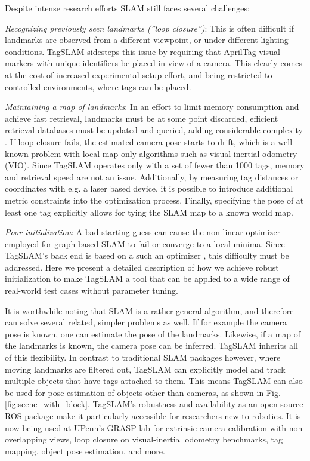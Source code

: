 Despite intense research efforts \cite{cadena2016} SLAM still faces
several challenges:

{\em Recognizing previously seen landmarks (''loop closure'')}: This
is often difficult if landmarks are observed from a different
viewpoint, or under different lighting conditions. TagSLAM sidesteps
this issue by requiring that AprilTag visual markers \cite{wang2016}
with unique identifiers be placed in view of a camera. This clearly
comes at the cost of increased experimental setup effort, and being
restricted to controlled environments, where tags can be placed.

{\em Maintaining a map of landmarks}: In an effort to limit memory
consumption and achieve fast retrieval, landmarks must be at some
point discarded, efficient retrieval databases must be updated and
queried, adding considerable complexity \cite{murartal2016}. If loop
closure fails, the estimated camera pose starts to drift, which is a
well-known problem with local-map-only algorithms such as
visual-inertial odometry (VIO). Since TagSLAM operates only with a set
of fewer than 1000 tags, memory and retrieval speed are not an
issue. Additionally, by measuring tag distances or coordinates with
e.g. a laser based device, it is possible to introduce additional
metric constraints into the optimization process. Finally, specifying
the pose of at least one tag explicitly allows for tying the SLAM map
to a known world map.

{\em Poor initialization}: A bad starting guess can cause the
non-linear optimizer employed for graph based SLAM to fail or converge
to a local minima. Since TagSLAM's back end is based on a such an
optimizer \cite{kaess2011}, this difficulty must be addressed. Here we
present a detailed description of how we achieve robust initialization
to make TagSLAM a tool that can be applied to a wide range of
real-world test cases without parameter tuning.

It is worthwhile noting that SLAM is a rather general algorithm, and
therefore can solve several related, simpler problems as well. If for
example the camera pose is known, one can estimate the pose of the
landmarks. Likewise, if a map of the landmarks is known, the camera
pose can be inferred. TagSLAM inherits all of this flexibility. In
contrast to traditional SLAM packages however, where moving landmarks
are filtered out, TagSLAM can explicitly model and track multiple
objects that have tags attached to them. This means TagSLAM can also
be used for pose estimation of objects other than cameras, as shown in
Fig. \ref{fig:scene_with_block}.  TagSLAM's robustness and
availability as an open-source ROS \cite{quigley2009} package make it
particularly accessible for researchers new to robotics. It is now
being used at UPenn's GRASP lab for extrinsic camera calibration with
non-overlapping views, loop closure on visual-inertial odometry
benchmarks, tag mapping, object pose estimation, and more.
